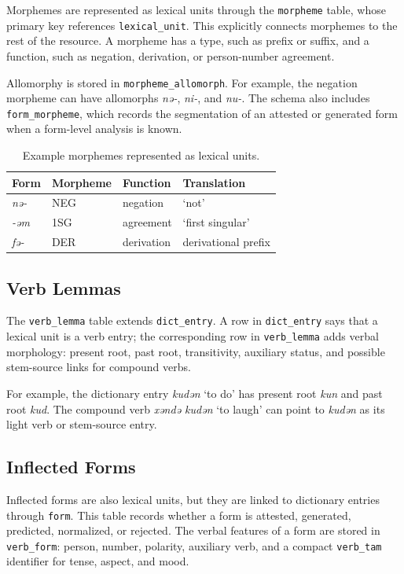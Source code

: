 \documentclass[11pt]{article}
\newcommand{\gil}[1]{\textit{#1}}
\newcommand{\code}[1]{\texttt{#1}}
\begin{document}
Morphemes are represented as lexical units through the \code{morpheme} table, whose primary key references \code{lexical\_unit}. This explicitly connects morphemes to the rest of the resource. A morpheme has a type, such as prefix or suffix, and a function, such as negation, derivation, or person-number agreement.

Allomorphy is stored in \code{morpheme\_allomorph}. For example, the negation morpheme can have allomorphs \gil{nǝ-}, \gil{ni-}, and \gil{nu-}. The schema also includes \code{form\_morpheme}, which records the segmentation of an attested or generated form when a form-level analysis is known.

\begin{table}[t]
\centering
\small
\begin{tabular}{llll}
\toprule
Form & Morpheme & Function & Translation \\
\midrule
\gil{nǝ-} & NEG & negation & `not' \\
\gil{-ǝm} & 1SG & agreement & `first singular' \\
\gil{fǝ-} & DER & derivation & derivational prefix \\
\bottomrule
\end{tabular}
\caption{Example morphemes represented as lexical units.}
\label{tab:morpheme-examples}
\end{table}

\subsection{Verb Lemmas}

The \code{verb\_lemma} table extends \code{dict\_entry}. A row in \code{dict\_entry} says that a lexical unit is a verb entry; the corresponding row in \code{verb\_lemma} adds verbal morphology: present root, past root, transitivity, auxiliary status, and possible stem-source links for compound verbs.

For example, the dictionary entry \gil{kudǝn} `to do' has present root \gil{kun} and past root \gil{kud}. The compound verb \gil{xǝndǝ kudǝn} `to laugh' can point to \gil{kudǝn} as its light verb or stem-source entry.

\subsection{Inflected Forms}

Inflected forms are also lexical units, but they are linked to dictionary entries through \code{form}. This table records whether a form is attested, generated, predicted, normalized, or rejected. The verbal features of a form are stored in \code{verb\_form}: person, number, polarity, auxiliary verb, and a compact \code{verb\_tam} identifier for tense, aspect, and mood.
\end{document}
